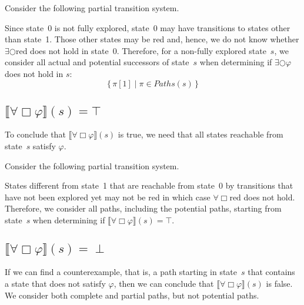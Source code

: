 \documentclass[12pt]{article}
\newcommand{\always}{\Box}
\newcommand{\nxt}{\bigcirc}
\theoremstyle{definition}
\newcommand{\satisfaction}[1]{\llbracket #1 \rrbracket}
\begin{document}
Consider the following partial transition system.
\begin{center}
\end{center}
Since state~0 is not fully explored, state~0 may have transitions to states other than state~1.  Those other states may be red and, hence, we do not know whether  $\exists \nxt \mbox{red}$ does not hold in state~0.  Therefore, for a non-fully explored state~$s$, we consider all actual and potential successors of state~$s$ when determining if $\exists \nxt \varphi$ does not hold in $s$:
\[
\{\, \pi[1] \mid \pi \in \mathit{Paths}(s) \,\}
\]

\subsection*{$\satisfaction{\forall \always \varphi}(s) = \top$}

To conclude that $\satisfaction{\forall \always \varphi}(s)$ is true, we need that all states reachable from state~$s$ satisfy $\varphi$.

Consider the following partial transition system.
\begin{center}
\end{center}
States different from state~1 that are reachable from state~0 by transitions that have not been explored yet may not be red in which case $\forall \always \mbox{red}$ does not hold.  Therefore, we consider all paths, including the potential paths, starting from state~$s$ when determining if $\satisfaction{\forall \always \varphi}(s) = \top$.

\subsection*{$\satisfaction{\forall \always \varphi}(s) = \perp$}

If we can find a counterexample, that is, a path starting in state~$s$ that contains a state that does not satisfy $\varphi$, then we can conclude that $\satisfaction{\forall \always \varphi}(s)$ is false.  We consider both complete and partial paths, but not potential paths.
\end{document}
